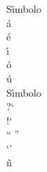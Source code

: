 \documentclass{article}
\begin{document}
S\'{\i}mbolo \\
\'a \\
\'e \\
\'{\i} \\ 
\'o \\
\'u \\

S\'{\i}mbolo \\
?` \\
!` \\
`` '' \\
`' \\
\~n
\end{document}
